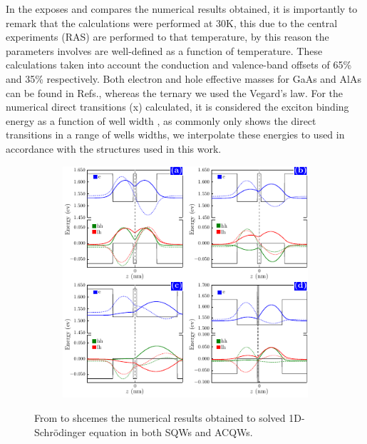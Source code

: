 In the  exposes and compares the numerical results obtained, it is importantly to remark that the calculations were performed at 30K, this due to the central experiments (RAS) are performed to that temperature, by this reason the parameters involves are well-defined as a function of temperature. These calculations taken into account the conduction and valence-band offsets of 65\% and 35\% respectively. Both electron and hole effective masses for GaAs and AlAs can be found in Refs.\cite{vurgaftman2001bandparameters,molenk1988determination,adachi2009properties}, whereas the ternary \algaas we used the Vegard's law\cite{donmez2012study}. For the numerical direct transitions (\gls{x}) calculated, it is considered the exciton binding energy as a function of well width \cite{yutaka1994theeffect,greene1984energylevels}, as commonly  only shows the direct transitions in a range of wells widths, we interpolate these energies to  used in accordance with the structures used in  this work. 

\begin{figure}[ht!]
	\centering
	\begin{subfigure}{\textwidth}
	\includegraphics[width=\textwidth]{../figures/chapter-2/numerical-calculations/build-ruco/numerical-results}
	\label{subfig:chapter-2-sec-numerical-results-a}
	\label{subfig:chapter-2-sec-numerical-results-b}
	\label{subfig:chapter-2-sec-numerical-results-c}
	\label{subfig:chapter-2-sec-numerical-results-d}
	\end{subfigure}
	\caption{From   to  shcemes the numerical results obtained to solved 1D-Schrödinger equation in both SQWs and ACQWs. }
	\label{fig:chapter-2-sec-numerical-calculations-results}
\end{figure} 

